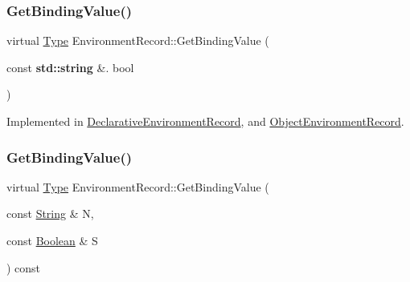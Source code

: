 \mbox{\label{struct_environment_record_afd78e04157f5d84cac025d2b0c867b4e}} 
\subsubsection{\texorpdfstring{Get\+Binding\+Value()}{GetBindingValue()}\hspace{0.1cm}{\footnotesize\ttfamily [1/2]}}
{\footnotesize\ttfamily virtual \hyperlink{class_type}{Type} Environment\+Record\+::\+Get\+Binding\+Value (\begin{DoxyParamCaption}\item[{const \textbf{ std\+::string} \&.}]{bool }\end{DoxyParamCaption})\hspace{0.3cm}{\ttfamily [pure virtual]}}



Implemented in \hyperlink{struct_declarative_environment_record_a53765619db78e907bf5b0da354b2c7fc}{Declarative\+Environment\+Record}, and \hyperlink{struct_object_environment_record_ad0e2d2c1d5010c81bee1df1988260dc7}{Object\+Environment\+Record}.

\mbox{\label{struct_environment_record_a38f1293eb4b23d22c0ee37ffff58dbdb}} 
\subsubsection{\texorpdfstring{Get\+Binding\+Value()}{GetBindingValue()}\hspace{0.1cm}{\footnotesize\ttfamily [2/2]}}
{\footnotesize\ttfamily virtual \hyperlink{class_type}{Type} Environment\+Record\+::\+Get\+Binding\+Value (\begin{DoxyParamCaption}\item[{const \hyperlink{struct_string}{String} \&}]{N,  }\item[{const \hyperlink{struct_boolean}{Boolean} \&}]{S }\end{DoxyParamCaption}) const\hspace{0.3cm}{\ttfamily [pure virtual]}}



